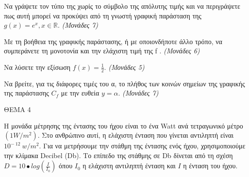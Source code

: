 \documentclass[11pt,a4paper,twoside]{book}
\newcommand{\monades}[1]{\hfill \textit{(Μονάδες #1)}}
\begin{document}
\begin{center}
\end{center}

\begin{alist}
\item Να γράψετε τον τύπο της χωρίς το σύμβολο της απόλυτης τιμής και να περιγράψετε πως αυτή μπορεί να προκύψει από τη γνωστή γραφική παράσταση της $g(x) = e^x, x \in \mathbb{R}$.
\monades{7}

\item Με τη βοήθεια της γραφικής παράστασης, ή με οποιονδήποτε άλλο τρόπο, να συμπεράνετε τη μονοτονία και την ελάχιστη τιμή της f .
\monades{6}

\item Να λύσετε την εξίσωση $f(x) = \frac{1}{2}$.
\monades{5}

\item Να βρείτε, για τις διάφορες τιμές του α, το πλήθος των κοινών σημείων της γραφικής της παράστασης $C_f$ με την ευθεία $y = \alpha$.
\monades{7}
\end{alist}

\vspace{4mm}

ΘΕΜΑ 4

Η μονάδα μέτρησης της έντασης του ήχου είναι το ένα Watt ανά τετραγωνικό μέτρο $\left( 1W/m^{2} \right)$. Στο ανθρώπινο αυτί, η ελάχιστη ένταση που γίνεται αντιληπτή είναι $10^{- \ 12}\ w/m^{2}$. Για να μετρήσουμε την στάθμη της έντασης ενός ήχου, χρησιμοποιούμε την κλίμακα Decibel (Db). Το επίπεδο της στάθμης σε Db δίνεται από τη σχέση $D = 10 \bullet log\left( \frac{I}{I_{0}} \right)$ όπου $I_{0}$ η ελάχιστη αντιληπτή ένταση και $I$ η ένταση του ήχου.
\end{document}
